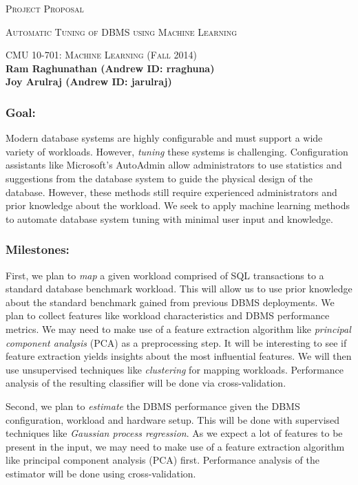 \documentclass{article}
\date{}
\begin{document}
\begin{center}
  \centerline{\textsc{\LARGE Project Proposal}}
  \vspace{0.5em}
  \centerline{\textsc{\Large Automatic Tuning of DBMS using Machine Learning}}
  \vspace{1em}
  \textsc{\large CMU 10-701: Machine Learning (Fall 2014)} \\
  \vspace{1em}  
  \textbf{\large{  Ram Raghunathan (Andrew ID: rraghuna)\\
  Joy Arulraj (Andrew ID: jarulraj)
  }}
\end{center}

\subsubsection*{Goal:} 
Modern database systems are highly configurable and must support a
wide variety of workloads. However, \textit{tuning} these systems is
challenging. Configuration assistants like Microsoft's AutoAdmin \cite{agrawal03} 
allow administrators to use statistics and suggestions from the database 
system to guide the physical design of the database. However, these methods 
still require experienced administrators and prior knowledge about the
workload. We seek to apply machine learning methods to automate database
system tuning with minimal user input and knowledge.

\subsubsection*{Milestones:} 
First, we plan to \textit{map} a given workload comprised of 
SQL transactions to a standard database benchmark workload. This will 
allow us to use prior knowledge about the standard benchmark gained from
previous DBMS deployments. We plan to collect features like
workload characteristics and DBMS performance metrics. 
We may need to make use of a feature extraction algorithm like 
\textit{principal component analysis} (PCA) as a preprocessing step.
It will be interesting to see if feature extraction yields insights 
about the most influential features.
We will then
use unsupervised techniques like \textit{clustering} for mapping workloads. 
Performance analysis of the resulting classifier will be done via 
cross-validation.

Second, we plan to \textit{estimate} the DBMS performance given the DBMS 
configuration, workload and hardware setup. This will be done
with supervised techniques like \textit{Gaussian process regression}. 
As we expect a lot of features to be present in the input, we may 
need to make use of a feature extraction algorithm like 
principal component analysis (PCA) first. 
Performance analysis of the estimator will be done using cross-validation.
\end{document}
